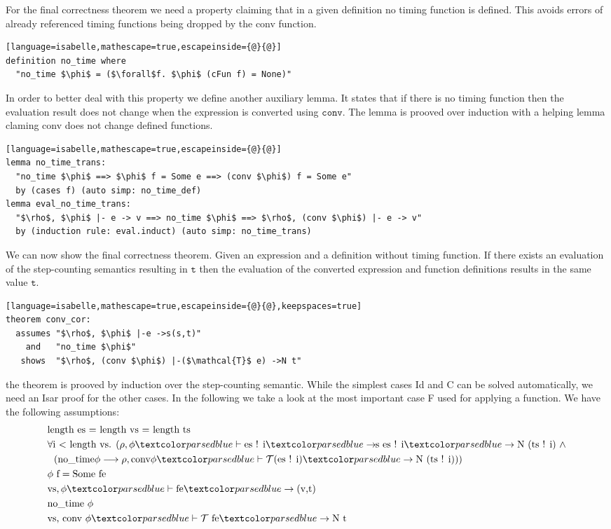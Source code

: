 For the final correctness theorem we need a property claiming that in a given definition no timing function is defined.
This avoids errors of already referenced timing functions being dropped by the conv function.
\begin{lstlisting}[language=isabelle,mathescape=true,escapeinside={@}{@}]
definition no_time where
  "no_time $\phi$ = ($\forall$f. $\phi$ (cFun f) = None)"
\end{lstlisting}

In order to better deal with this property we define another auxiliary lemma.
It states that if there is no timing function then the evaluation result does not change when the expression is converted using $\texttt{conv}$.
The lemma is prooved over induction with a helping lemma claming conv does not change defined functions.
\begin{lstlisting}[language=isabelle,mathescape=true,escapeinside={@}{@}]
lemma no_time_trans:
  "no_time $\phi$ ==> $\phi$ f = Some e ==> (conv $\phi$) f = Some e"
  by (cases f) (auto simp: no_time_def)
lemma eval_no_time_trans:
  "$\rho$, $\phi$ |- e -> v ==> no_time $\phi$ ==> $\rho$, (conv $\phi$) |- e -> v"
  by (induction rule: eval.induct) (auto simp: no_time_trans)
\end{lstlisting}

We can now show the final correctness theorem.
Given an expression and a definition without timing function.
If there exists an evaluation of the step-counting semantics resulting in $\texttt{t}$ then the evaluation of the converted expression and function definitions results in the same value $\texttt{t}$.
\begin{lstlisting}[language=isabelle,mathescape=true,escapeinside={@}{@},keepspaces=true]
theorem conv_cor:
  assumes "$\rho$, $\phi$ |-e ->s(s,t)"
    and   "no_time $\phi$"
   shows  "$\rho$, (conv $\phi$) |-($\mathcal{T}$ e) ->N t"
\end{lstlisting}

the theorem is prooved by induction over the step-counting semantic.
While the simplest cases Id and C can be solved automatically, we need an Isar proof for the other cases.
In the following we take a look at the most important case F used for applying a function.
We have the following assumptions:
\begin{align}
  &\text{length es = length vs = length ts} \label{cor:len}\\
  &\forall\text{i < length vs. } (\rho, \phi \hvdash \text{es ! i} \hrightarrows \text{es ! i} \hrightarrow \text{N (ts ! i)}\ \land \label{cor:args}\\
  &\ \ (\text{no\_time} \phi \longrightarrow \rho, \text{conv} \phi \hvdash \mathcal{T} \text{(es ! i)} \hrightarrow \text{N (ts ! i)}))\nonumber\\
  &\phi\ \text{f} = \text{Some fe} \label{cor:phi}\\
  &\text{vs}, \phi \hvdash \text{fe} \hrightarrow \text{(v,t)} \label{cor:feeval}\\
  &\text{no\_time}\ \phi \label{cor:notime}\\
  &\text{vs, conv}\ \phi \hvdash \mathcal{T}\ \text{fe} \hrightarrow \text{N t} \label{cor:Tfeeval}
\end{align}

